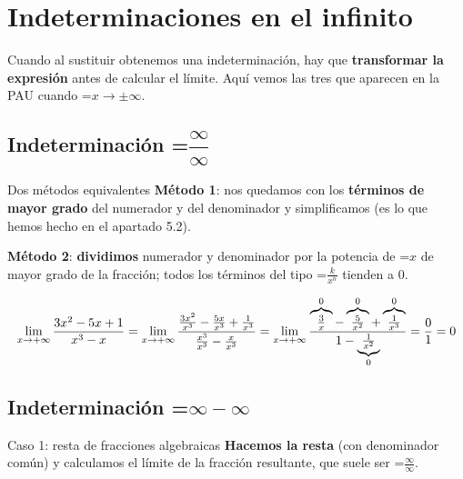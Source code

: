 \documentclass[11pt,a4paper]{article}
\newcommand{\fmm}[1]{\setbox0=\hbox{$#1$}\ifdim\wd0>\linewidth\fmdisp{#1}\else\mbox{\box0}\fi}
\newcommand{\fmdisp}[1]{\[\setbox2=\hbox{$\displaystyle #1$}\ifdim\wd2>\linewidth\resizebox{\linewidth}{!}{\box2}\else\box2\fi\]}
\begin{document}
\section{Indeterminaciones en el infinito}\hypertarget{sec4}{}

Cuando al sustituir obtenemos una indeterminación, hay que \textbf{transformar la expresión} antes de calcular el límite. Aquí vemos las tres que aparecen en la PAU cuando \fmm{x\to\pm\infty}.

\subsection*{Indeterminación \fmm{\dfrac{\infty}{\infty}}}

\begin{fmdef}{Dos métodos equivalentes}
\textbf{Método 1}: nos quedamos con los \textbf{términos de mayor grado} del numerador y del denominador y simplificamos (es lo que hemos hecho en el apartado 5.2).

\textbf{Método 2}: \textbf{dividimos} numerador y denominador por la potencia de \fmm{x} de mayor grado de la fracción; todos los términos del tipo \fmm{\frac{k}{x^n}} tienden a 0.

\fmdisp{\lim_{x\to+\infty}\frac{3x^2-5x+1}{x^3-x}=\lim_{x\to+\infty}\frac{\frac{3x^2}{x^3}-\frac{5x}{x^3}+\frac{1}{x^3}}{\frac{x^3}{x^3}-\frac{x}{x^3}}=\lim_{x\to+\infty}\frac{\overbrace{\tfrac{3}{x}}^{0}-\overbrace{\tfrac{5}{x^2}}^{0}+\overbrace{\tfrac{1}{x^3}}^{0}}{1-\underbrace{\tfrac{1}{x^2}}_{0}}=\frac01=0}

\end{fmdef}

\subsection*{Indeterminación \fmm{\infty-\infty}}

\begin{fmdef}{Caso 1: resta de fracciones algebraicas}
\textbf{Hacemos la resta} (con denominador común) y calculamos el límite de la fracción resultante, que suele ser \fmm{\frac{\infty}{\infty}}.
\end{fmdef}
\end{document}
